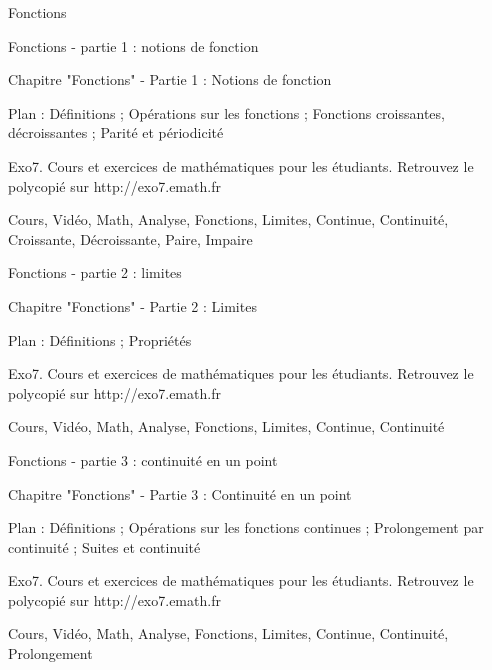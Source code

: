 
   Fonctions

Fonctions - partie 1 : notions de fonction



Chapitre "Fonctions" - Partie 1 : Notions de fonction

Plan : Définitions ; Opérations sur les fonctions ; Fonctions croissantes, décroissantes ; Parité et périodicité

Exo7. Cours et exercices de mathématiques pour les étudiants.
Retrouvez le polycopié sur http://exo7.emath.fr


Cours, Vidéo, Math, Analyse, Fonctions, Limites, Continue, Continuité, Croissante, Décroissante, Paire, Impaire


Fonctions - partie 2 : limites



Chapitre "Fonctions" - Partie 2 : Limites

Plan : Définitions ; Propriétés

Exo7. Cours et exercices de mathématiques pour les étudiants.
Retrouvez le polycopié sur http://exo7.emath.fr


Cours, Vidéo, Math, Analyse, Fonctions, Limites, Continue, Continuité



Fonctions - partie 3 : continuité en un point 



Chapitre "Fonctions" - Partie 3 : Continuité en un point

Plan : Définitions ; Opérations sur les fonctions continues ; Prolongement par continuité ; Suites et continuité

Exo7. Cours et exercices de mathématiques pour les étudiants.
Retrouvez le polycopié sur http://exo7.emath.fr


Cours, Vidéo, Math, Analyse, Fonctions, Limites, Continue, Continuité, Prolongement 



